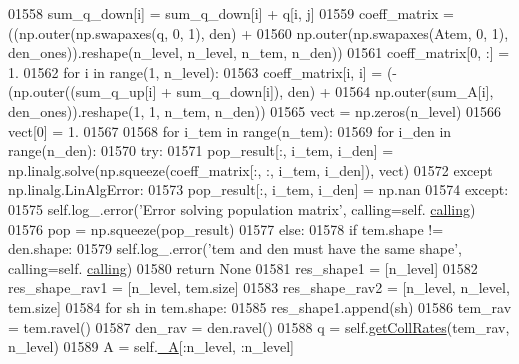 \begin{DoxyCode}
{{01558                     sum\_q\_down[i] = sum\_q\_down[i] + q[i, j]
01559             coeff\_matrix = ((np.outer(np.swapaxes(q, 0, 1), den) + 
01560                              np.outer(np.swapaxes(Atem, 0, 1), den\_ones)).reshape(n\_level, n\_level, n\_tem, 
      n\_den))
01561             coeff\_matrix[0, :] = 1.
01562             \textcolor{keywordflow}{for} i \textcolor{keywordflow}{in} range(1, n\_level):
01563                 coeff\_matrix[i, i] = (-(np.outer((sum\_q\_up[i] + sum\_q\_down[i]), den) + 
01564                                         np.outer(sum\_A[i], den\_ones)).reshape(1, 1, n\_tem, n\_den))
01565             vect = np.zeros(n\_level)
01566             vect[0] = 1.
01567     
01568             \textcolor{keywordflow}{for} i\_tem \textcolor{keywordflow}{in} range(n\_tem):
01569                 \textcolor{keywordflow}{for} i\_den \textcolor{keywordflow}{in} range(n\_den):
01570                     \textcolor{keywordflow}{try}:
01571                         pop\_result[:, i\_tem, i\_den] = np.linalg.solve(np.squeeze(coeff\_matrix[:, :, i\_tem, 
      i\_den]), vect)
01572                     \textcolor{keywordflow}{except} np.linalg.LinAlgError:
01573                         pop\_result[:, i\_tem, i\_den] = np.nan
01574                     \textcolor{keywordflow}{except}:
01575                         self.log\_.error(\textcolor{stringliteral}{'Error solving population matrix'}, calling=self.
      \hyperlink{classpyneb_1_1core_1_1pynebcore_1_1_atom_a373b7735acf4f528b54bddf373ad67a1}{calling})
01576             pop = np.squeeze(pop\_result)
01577         \textcolor{keywordflow}{else}:
01578             \textcolor{keywordflow}{if} tem.shape != den.shape:
01579                 self.log\_.error(\textcolor{stringliteral}{'tem and den must have the same shape'}, calling=self.
      \hyperlink{classpyneb_1_1core_1_1pynebcore_1_1_atom_a373b7735acf4f528b54bddf373ad67a1}{calling})
01580                 \textcolor{keywordflow}{return} \textcolor{keywordtype}{None}
01581             res\_shape1 = [n\_level]
01582             res\_shape\_rav1 = [n\_level, tem.size]
01583             res\_shape\_rav2 = [n\_level, n\_level, tem.size]
01584             \textcolor{keywordflow}{for} sh \textcolor{keywordflow}{in} tem.shape:
01585                 res\_shape1.append(sh)
01586             tem\_rav = tem.ravel()
01587             den\_rav = den.ravel()
01588             q = self.\hyperlink{classpyneb_1_1core_1_1pynebcore_1_1_atom_a34711ea989baf7bde752a68255d32098}{getCollRates}(tem\_rav, n\_level)
01589             A = self.\hyperlink{classpyneb_1_1core_1_1pynebcore_1_1_atom_aa6416fe661b8deaa008179314727e025}{\_A}[:n\_level, :n\_level]
}}
\end{DoxyCode}
